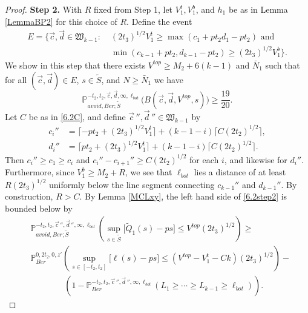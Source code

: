 \begin{proof}
	{\bf \raggedleft Step 2.} With $R$ fixed from Step 1, let $V_1^t, V_1^b$, and $h_1$ be as in Lemma \ref{LemmaBP2}  for this choice of $R$. Define the event
	\begin{equation}\label{6.2E}
	\begin{split}
	E = \big\{ \vec{c}, \vec{d} \in \mathfrak{W}_{k-1} : &\; (2t_3)^{1/2} V_1^t \geq \max(c_1 + p t_2 d_1 - pt_2) \mbox{ and }\\
	&\; \min(c_{k-1} + p t_2, d_{k-1} - pt_2)  \geq (2t_3)^{1/2} V_1^b \big\}.
	\end{split}
	\end{equation}
	We show in this step that there exists $V^{top} \geq M_2 + 6(k-1)$ and $\bar{N}_1$ such that for all $(\vec{c}, \vec{d}) \in E$, $s\in\tilde{S}$, and $N\geq\bar{N}_1$ we have
	\begin{equation}\label{6.2step2}
	\mathbb{P}^{-t_2,t_2,\vec{c},\vec{d},\infty,\ell_{bot}}_{avoid,Ber;\tilde S}\big(B(\vec{c},\vec{d},V^{top},s)\big) \geq  \frac{19}{20}.
	\end{equation}
	Let $C$ be as in \eqref{6.2C}, and define $\vec{c}\,'', \vec{d}\,'' \in \mathfrak{W}_{k-1}$ by
	\begin{align*}
	c_i'' &= \lceil -pt_2 + (2t_3)^{1/2} V_1^t\rceil + (k-1-i)\lceil C(2t_2)^{1/2}\rceil,\\
	d_i'' &= \lceil pt_2 + (2t_3)^{1/2} V_1^t\rceil + (k-1-i)\lceil C(2t_2)^{1/2}\rceil.
	\end{align*}
	Then $c_i'' \geq c_1 \geq c_i$ and $c_i'' - c_{i+1}'' \geq C(2t_2)^{1/2}$ for each $i$, and likewise for $d_i''$. Furthermore, since $V_1^b \geq M_2+R$, we see that $\ell_{bot}$ lies a distance of at least $R(2t_3)^{1/2}$ uniformly below the line segment connecting $c_{k-1}''$ and $d_{k-1}''$. By construction, $R>C$. By Lemma \ref{MCLxy}, the left hand side of \eqref{6.2step2} is bounded below by
	\begin{equation}\label{6.2step3split}
	\begin{split}
	&\mathbb{P}^{-t_2,t_2,\vec{c}\,'', \vec{d}\,'', \infty,\ell_{bot}}_{avoid, Ber;\tilde S}\left(\sup_{s\in \tilde S}\big[\tilde Q_1(s) - ps\big] \leq V^{top}(2t_3)^{1/2}\right) \geq\\
	& \mathbb{P}^{0,2t_2,0,z'}_{Ber}\left(\sup_{s\in[-t_2,t_2]}\big[\ell(s) - ps\big] \leq (V^{top}-V_1^t-Ck)(2t_3)^{1/2}\right) -\\ &\qquad\qquad \left(1 - \mathbb{P}^{-t_2,t_2,\vec{c}\,'', \vec{d}\,'', \infty,\ell_{bot}}_{Ber}\left(L_1\geq\cdots\geq L_{k-1}\geq \ell_{bot}\right)\right).
	\end{split}

\end{equation}
\end{proof}

